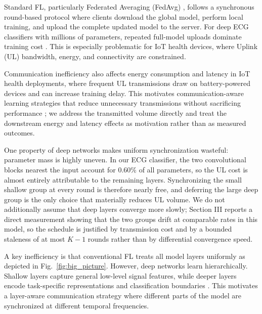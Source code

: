 \documentclass[10pt,conference]{IEEEtran}
\begin{document}
Standard FL, particularly Federated Averaging (FedAvg) \cite{mcmahan2017}, follows a synchronous round-based protocol where clients download the global model, perform local training, and upload the complete updated model to the server. For deep ECG classifiers with millions of parameters, repeated full-model uploads dominate training cost \cite{konecny2016}. This is especially problematic for IoT health devices, where Uplink (UL) bandwidth, energy, and connectivity are constrained.


Communication inefficiency also affects energy consumption and latency in IoT health deployments, where frequent UL transmissions draw on battery-powered devices and can increase training delay. This motivates communication-aware learning strategies that reduce unnecessary transmissions without sacrificing performance \cite{konecny2016strategies,tariq2024}; we address the transmitted volume directly and treat the downstream energy and latency effects as motivation rather than as measured outcomes.

One property of deep networks makes uniform synchronization wasteful: parameter mass is highly uneven. In our ECG classifier, the two convolutional blocks nearest the input account for $0.60\%$ of all parameters, so the UL cost is almost entirely attributable to the remaining layers. Synchronizing the small shallow group at every round is therefore nearly free, and deferring the large deep group is the only choice that materially reduces UL volume. We do not additionally assume that deep layers converge more slowly; Section III reports a direct measurement showing that the two groups drift at comparable rates in this model, so the schedule is justified by transmission cost and by a bounded staleness of at most $K-1$ rounds rather than by differential convergence speed.

A key inefficiency is that conventional FL treats all model layers uniformly as depicted in Fig.~\ref{fig:big_picture}. However, deep networks learn hierarchically. Shallow layers capture general low-level signal features, while deeper layers encode task-specific representations and classification boundaries \cite{yosinski2014}. This motivates a layer-aware communication strategy where different parts of the model are synchronized at different temporal frequencies.
\end{document}
